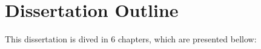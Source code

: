 


\section{Dissertation Outline}
\label{sec:dissertaion_outline}
This dissertation is dived in 6 chapters, which are presented bellow:


